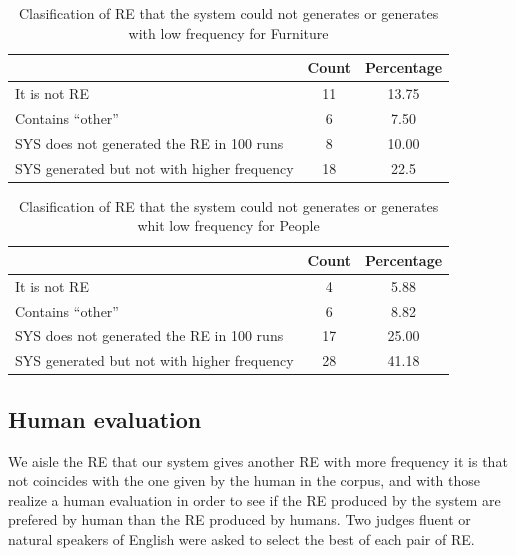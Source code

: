 \begin{table}[h!]
\begin{center}
\begin{tabular}{|l|c|c|}
\hline
		& Count		& Percentage\\
\hline
It is not RE	&	11	&	13.75 \\
Contains ``other''	&	6	&	7.50 \\
\hline
SYS does not generated the RE in 100 runs	&	8	&	10.00 \\
SYS generated but not with higher frequency	&	18	&	22.5 \\
\hline
\end{tabular}
\vspace*{.1cm}
\caption{Clasification of RE that the system could not generates or generates with low frequency for Furniture}
\label{error-people}
\end{center}
\end{table}
\vspace*{-.4cm}

\begin{table}[h!]
\begin{center}
\begin{tabular}{|l|c|c|}
\hline
			& Count		& Percentage\\
\hline
It is not RE		&	4	&	5.88 \\
Contains ``other''	&	6	&	8.82 \\
\hline
SYS does not generated the RE in 100 runs	&	17	&	25.00 \\
SYS generated but not with higher frequency	&	28	&	41.18 \\

\hline
\end{tabular}
\vspace*{.1cm}
\caption{Clasification of RE that the system could not generates or generates whit low frequency for People}
\label{error-furniture}
\end{center}
\end{table}
\vspace*{-.4cm}
\subsection{Human evaluation} \label{sec:evaluation}

We aisle the RE that our system gives another RE with more frequency it is that not coincides with the one given by the human in the corpus, and with those realize a human evaluation in order to see if the RE produced by the system are prefered by human than the RE produced by humans. Two judges fluent or natural speakers of English were asked to select the best of each pair of RE.

